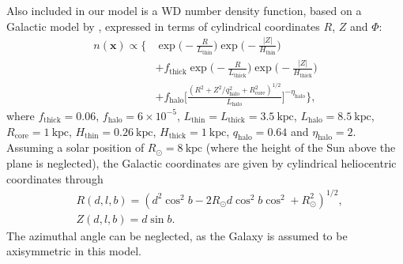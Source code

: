 \documentclass[fleqn,usenatbib]{mnras}
\newcommand{\kpc}{\text{kpc}}
\begin{document}
Also included in our model is a WD number density function, based on a Galactic model by \cite{2008ApJ...673..864J}, expressed in terms of cylindrical coordinates $R$, $Z$ and $\Phi$:
\begin{equation}\label{eq:numberdensity}
\begin{split}
	n(\mathbf{x}) \propto
	\Bigg\{ 
		& \exp\Bigg(-\frac{R}{L_\text{thin}}\Bigg)\exp\Bigg(-\frac{|Z|}{H_\text{thin}}\Bigg) \\
		& +f_\text{thick}\exp\Bigg(-\frac{R}{L_\text{thick}}\Bigg)\exp\Bigg(-\frac{|Z|}{H_\text{thick}}\Bigg) \\
		& +f_\text{halo}\Bigg[ \frac{(R^2+Z^2/q_\text{halo}^2+R_\text{core}^2)^{1/2}}{L_\text{halo}} \Bigg]^{-\eta_\text{halo}}
	\Bigg\},
\end{split}
\end{equation}
where $f_\text{thick}=0.06$, $f_\text{halo}=6\times10^{-5}$, $L_\text{thin}=L_\text{thick}=3.5~\kpc$, $L_\text{halo}=8.5~\kpc$, $R_\text{core}=1~\kpc$, $H_\text{thin}=0.26~\kpc$, $H_\text{thick}=1~\kpc$, $q_\text{halo}=0.64$ and $\eta_\text{halo} = 2$. Assuming a solar position of $R_\odot=8~\kpc$ (where the height of the Sun above the plane is neglected), the Galactic coordinates are given by cylindrical heliocentric coordinates through
\begin{equation}
\begin{split}
	& R(d,l,b) = (d^2\cos^2b-2 R_\odot d \cos^2b\cos^2+R_\odot^2)^{1/2}, \\
	& Z(d,l,b) = d \sin b.
\end{split}
\end{equation}
The azimuthal angle can be neglected, as the Galaxy is assumed to be axisymmetric in this model.
\end{document}
